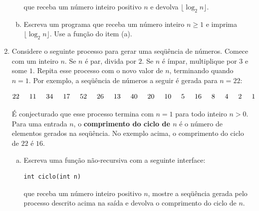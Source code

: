 \documentclass[a4paper,10pt]{article}
\begin{document}
\begin{enumerate}
\begin{enumerate}[(a)]
que receba um número inteiro positivo $n$ e devolva $\lfloor
\log_2 n \rfloor$. 

\item Escreva um programa que receba um número inteiro $n \geq 1$ e imprima $\lfloor \log_2 n \rfloor$. 
Use a função do item (a). 
\end{enumerate}

\pagebreak

\item Considere o seguinte processo para gerar uma seqüência de números.
Comece com um inteiro $n$. Se $n$ é par, divida por $2$.
Se $n$ é ímpar, multiplique por $3$ e some $1$. 
Repita esse processo com o novo valor de $n$, terminando quando $n = 1$.
Por exemplo, a seqüência de números a seguir é gerada para $n = 22$:

  \[
  22 \hspace*{.5cm} 11 \hspace*{.5cm} 34 \hspace*{.5cm} 17 
  \hspace*{.5cm} 52 \hspace*{.5cm} 26 \hspace*{.5cm} 13 \hspace*{.5cm} 
  40 \hspace*{.5cm} 20 \hspace*{.5cm} 10 \hspace*{.5cm} 5
  \hspace*{.5cm} 16 \hspace*{.5cm} 8 \hspace*{.5cm} 4 \hspace*{.5cm} 2
  \hspace*{.5cm} 1   
  \]

É conjecturado que esse processo termina com $n = 1$ para todo inteiro $n > 0$.
Para uma entrada $n$, o \textbf{comprimento do ciclo de $n$} é o número de elementos gerados na seqüência.
No exemplo acima, o comprimento do ciclo de $22$ é $16$. 

\begin{enumerate}[(a)]
  \item Escreva uma função não-recursiva com a seguinte interface:

\begin{lstlisting}
int ciclo(int n)
\end{lstlisting}

que receba um número inteiro positivo $n$, mostre a seqüência gerada pelo processo descrito acima 
na saída e devolva o comprimento do ciclo de $n$. 


\end{enumerate}
\end{enumerate}
\end{document}

